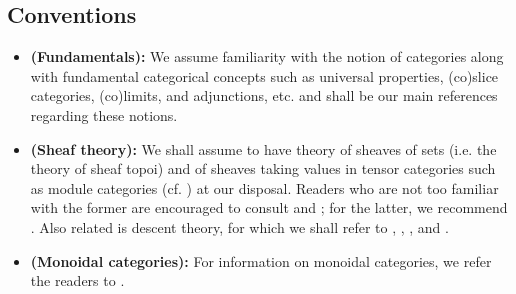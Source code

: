     \subsection{Conventions}
        \begin{convention} \label{conv: category_theory}
            \noindent
            \begin{itemize}
                \item \textbf{(Fundamentals):} We assume familiarity with the notion of categories along with fundamental categorical concepts such as universal properties, (co)slice categories, (co)limits, and adjunctions, etc. \cite{maclane} and \cite[\href{https://stacks.math.columbia.edu/tag/0011}{Tag 0011}]{stacks} shall be our main references regarding these notions.
                \item \textbf{(Sheaf theory):} We shall assume to have theory of sheaves of sets (i.e. the theory of sheaf topoi) and of sheaves taking values in tensor categories such as module categories (cf. \cite{EGNO}) at our disposal. Readers who are not too familiar with the former are encouraged to consult \cite{sga4} and \cite[\href{https://stacks.math.columbia.edu/tag/00UZ}{Tag 00UZ}]{stacks}; for the latter, we recommend \cite[\href{https://stacks.math.columbia.edu/tag/006A}{Tag 006A}, \href{https://stacks.math.columbia.edu/tag/01AC}{Tag 01AC}, and \href{https://stacks.math.columbia.edu/tag/03A4}{Tag 03A4}]{stacks}. Also related is descent theory, for which we shall refer to \cite{vistoli_descent}, \cite[section C2.1]{elephant1}, \cite[Chapter III]{sheaves_in_geometry_and_logic}, and \cite[\href{https://stacks.math.columbia.edu/tag/0266}{Tag 0266} and \href{https://stacks.math.columbia.edu/tag/0238}{Tag 0238}]{stacks}.
                \item \textbf{(Monoidal categories):} For information on monoidal categories, we refer the readers to \cite{EGNO}.
            \end{itemize}
        \end{convention}
        
